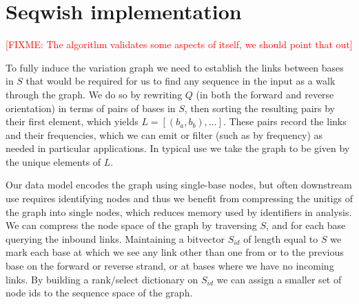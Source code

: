 \documentclass{bioinfo}
\theoremstyle{definition}
\newcommand{\red}[1]{{\textcolor{Red}{#1}}}
\newcommand{\FIXME}[1]{\red{[FIXME: #1]}}
\begin{document}
\begin{comment}
By recording the relationship between sequence graph and alignment graph nodes, we are able to trace the paths of pangenome sequences through the graph, producing our target: a pangenome variation graph that completely describes both the input assemblies and their alignments (Fig.~\ref{fig:from_alignment_to_variation_graph}).


Seqwish implements a lossless conversion from pairwise alignments between sequences to a variation graph encoding the sequences and their alignments.
As input, we typically take all-versus-all alignments, but the exact structure of the alignment set may be defined in an application specific way.
Seqwish uses a series of disk-backed sorts and passes over the alignment and sequence inputs to allow the graph to be constructed in low memory relative to the size of the input sequence set.
Memory usage during construction and traversal is limited by the use of sorted disk-backed arrays and succinct rank/select dictionaries to record a queryable version of the graph.

\end{comment}




\section{Seqwish implementation}
\label{sec:implementation}

    \FIXME{The algorithm validates some aspects of itself, we should point that out}


    To fully induce the variation graph we need to establish the links between bases in $S$ that would be required for us to find any sequence in the input as a walk through the graph.
    We do so by rewriting $Q$ (in both the forward and reverse orientation) in terms of pairs of bases in $S$, then sorting the resulting pairs by their first element, which yields $L = [(b_{a}, b_{b}), \ldots ]$.
    These pairs record the links and their frequencies, which we can emit or filter (such as by frequency) as needed in particular applications.
    In typical use we take the graph to be given by the unique elements of $L$.

    Our data model encodes the graph using single-base nodes, but often downstream use requires identifying nodes and thus we benefit from compressing the unitigs of the graph into single nodes, which reduces memory used by identifiers in analysis.
    We can compress the node space of the graph by traversing $S$, and for each base querying the inbound links.
    Maintaining a bitvector $S_{id}$ of length equal to $S$ we mark each base at which we see any link other than one from or to the previous base on the forward or reverse strand, or at bases where we have no incoming links.
    By building a rank/select dictionary on $S_{id}$ we can assign a smaller set of node ids to the sequence space of the graph.
\end{document}
